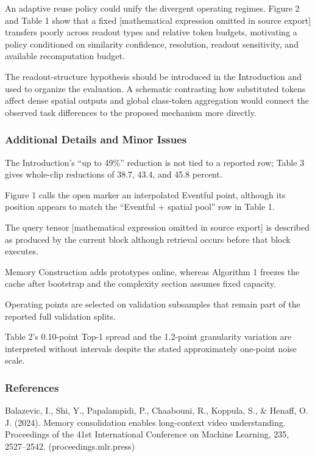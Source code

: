 \documentclass[11pt]{article}
\begin{document}
An adaptive reuse policy could unify the divergent operating regimes. Figure 2 and Table 1 show that a fixed [mathematical expression omitted in source export] transfers poorly across readout types and relative token budgets, motivating a policy conditioned on similarity confidence, resolution, readout sensitivity, and available recomputation budget.

The readout-structure hypothesis should be introduced in the Introduction and used to organize the evaluation. A schematic contrasting how substituted tokens affect dense spatial outputs and global class-token aggregation would connect the observed task differences to the proposed mechanism more directly.

\subsubsection*{Additional Details and Minor Issues}

The Introduction's ``up to 49\%'' reduction is not tied to a reported row; Table 3 gives whole-clip reductions of 38.7, 43.4, and 45.8 percent.

Figure 1 calls the open marker an interpolated Eventful point, although its position appears to match the ``Eventful + spatial pool'' row in Table 1.

The query tensor [mathematical expression omitted in source export] is described as produced by the current block although retrieval occurs before that block executes.

Memory Construction adds prototypes online, whereas Algorithm 1 freezes the cache after bootstrap and the complexity section assumes fixed capacity.

Operating points are selected on validation subsamples that remain part of the reported full validation splits.

Table 2's 0.10-point Top-1 spread and the 1.2-point granularity variation are interpreted without intervals despite the stated approximately one-point noise scale.

\subsubsection*{References}

Balazevic, I., Shi, Y., Papalampidi, P., Chaabouni, R., Koppula, S., \& Henaff, O. J. (2024). Memory consolidation enables long-context video understanding. Proceedings of the 41st International Conference on Machine Learning, 235, 2527--2542. (proceedings.mlr.press)
\end{document}
